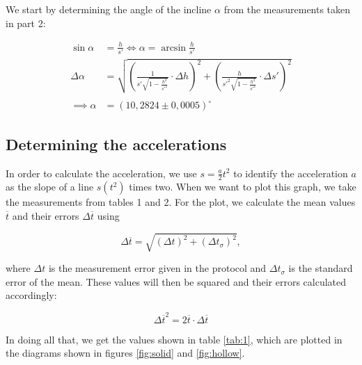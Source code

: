 \documentclass{article}
\begin{document}
We start by determining the angle of the incline $\alpha$ from the measurements taken in part 2:

\begin{equation}
    \begin{split}
        \sin{\alpha} &= \frac{h}{s'} \iff \alpha = \arcsin{\frac{h}{s'}} \\
        \Delta \alpha &= \sqrt{\left( \frac{1}{s' \sqrt{1-\frac{h^2}{s'^2}}} \cdot \Delta h \right)^2 + \left( \frac{h}{s'^2 \sqrt{1-\frac{h^2}{s'^2}}} \cdot \Delta s' \right)^2} \\ \\
        \implies \alpha &= (10,2824 \pm 0,0005)^\circ
    \end{split}
    \label{eq:99}
\end{equation}

\subsection{Determining the accelerations}

In order to calculate the acceleration, we use $s=\frac{a}{2}t^2$ to identify the acceleration $a$ as the slope of a line $s(t^2)$ times two. When we want to plot this graph, we take the measurements from tables 1 and 2. For the plot, we calculate the mean values $\overline{t}$ and their errors $\Delta \overline{t}$ using

\begin{equation}
    \Delta \overline{t} = \sqrt{(\Delta t)^2 + (\Delta t_\sigma)^2},
    \label{eq:98}
\end{equation}

where $\Delta t$ is the measurement error given in the protocol and $\Delta t_\sigma$ is the standard error of the mean. These values will then be squared and their errors calculated accordingly:

\begin{equation}
    \Delta \overline{t}^2 = 2 \overline{t} \cdot \Delta \overline{t}
\end{equation}

In doing all that, we get the values shown in table \ref{tab:1}, which are plotted in the diagrams shown in figures \ref{fig:solid} and \ref{fig:hollow}. 
\end{document}
